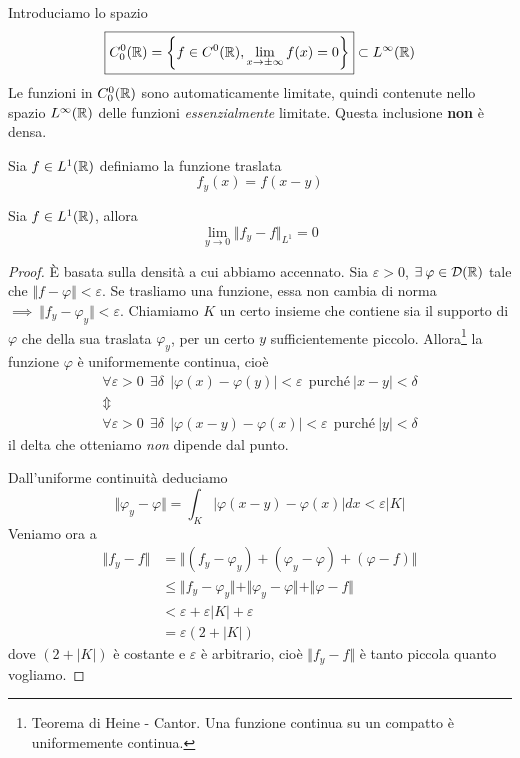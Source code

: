 Introduciamo lo spazio
\begin{equation*}
\boxed{C^{0}_{0}(\mathbb{R}) = \left\{f\in C^{0}(\mathbb{R}), \lim_{x\rightarrow \pm \infty} f(x) = 0\right\}} \subset L^{\infty}(\mathbb{R})
\end{equation*}
Le funzioni in $C^{0}_{0}(\mathbb{R})$ sono automaticamente limitate, quindi contenute nello spazio $L^{\infty}(\mathbb{R})$ delle funzioni \textit{essenzialmente} limitate. Questa inclusione \textbf{non} è densa.

Sia $f\in L^{1}(\mathbb{R})$ definiamo la funzione traslata
\begin{equation*}
f_{y}(x) = f(x - y)
\end{equation*}
\begin{thm}
Sia $f\in L^{1}(\mathbb{R})$, allora
\begin{equation*}
\lim\limits_{y\rightarrow 0} \Vert f_{y} - f \Vert_{L^{1}} = 0
\end{equation*}
\end{thm}
\begin{proof}

È basata sulla densità a cui abbiamo accennato. Sia $\varepsilon > 0$, $\exists \varphi \in \Dc(\RR)$ tale che $ \Vert f - \varphi \Vert < \varepsilon $. Se trasliamo una funzione, essa non cambia di norma $\implies \ \Vert f_{y} - \varphi_{y} \Vert < \varepsilon $. Chiamiamo $K$ un certo insieme che contiene sia il supporto di $\varphi $ che della sua traslata $\varphi_{y}$, per un certo $y$ sufficientemente piccolo. Allora\footnote{Teorema di Heine - Cantor. Una funzione continua su un compatto è uniformemente continua.} la funzione $\varphi $ è uniformemente continua, cioè
\begin{gather*}
\forall \varepsilon > 0\ \ \exists \delta \ \ | \varphi (x) - \varphi (y)| < \varepsilon \ \ \text{purché} \ | x - y| < \delta \\
\Updownarrow \\
\forall \varepsilon > 0\ \ \exists \delta \ \ | \varphi (x - y) - \varphi (x)| < \varepsilon \ \ \text{purché} \ | y| < \delta
\end{gather*}
il delta che otteniamo \textit{non} dipende dal punto.

Dall'uniforme continuità deduciamo
\begin{equation*}
\Vert \varphi_{y} - \varphi \Vert = \int_{K}| \varphi (x - y) - \varphi (x)| dx < \varepsilon | K|
\end{equation*}
Veniamo ora a
\begin{align*}
\Vert f_{y} - f \Vert & = \Vert (f_{y} - \varphi_{y}) + (\varphi_{y} - \varphi) + (\varphi - f) \Vert \\
 & \leq \Vert f_{y} - \varphi_{y} \Vert + \Vert \varphi_{y} - \varphi \Vert + \Vert \varphi - f \Vert \\
 & < \varepsilon + \varepsilon | K| + \varepsilon \\
 & = \varepsilon (2 + | K|)
\end{align*}
dove $(2 + | K|)$ è costante e $\varepsilon $ è arbitrario, cioè $ \Vert f_{y} - f \Vert $ è tanto piccola quanto vogliamo.
\end{proof}

